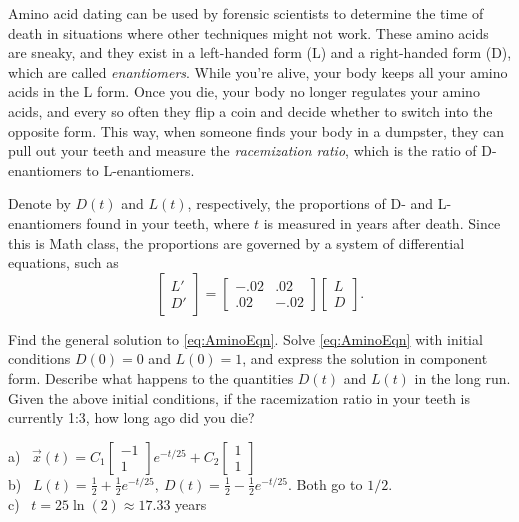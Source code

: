 \begin{exercise}
Amino acid dating can be used by forensic scientists to determine the time of death in situations where other techniques might not work. These amino acids are sneaky, and they exist in a left-handed form (L) and a right-handed form (D), which are called {\it enantiomers}. While you’re alive, your body keeps all your amino acids in the L form. Once you die, your body no longer regulates your amino acids, and every so often they flip a coin and decide whether to switch into the opposite form. This way, when someone finds your body in a dumpster, they can pull out your teeth and measure the {\it racemization ratio}, which is the ratio of D-enantiomers to L-enantiomers. %

Denote by $D(t)$ and $L(t)$, respectively, the proportions of D- and L-enantiomers found in your teeth, where $t$ is measured in years after death. Since this is Math class, the proportions are governed by a system of differential equations, such as
\begin{equation}
\begin{bmatrix} L' \\ D' \end{bmatrix} = \begin{bmatrix} -.02& .02\\ .02 & -.02 \end{bmatrix}\begin{bmatrix} L\\ D \end{bmatrix}.\label{eq:AminoEqn}
\end{equation}
\begin{tasks}
\task Find the general solution to \eqref{eq:AminoEqn}.
\task Solve \eqref{eq:AminoEqn} with initial conditions $D(0) = 0$ and $L(0) = 1$, and express the solution in component form. Describe what happens to the quantities $D(t)$ and $L(t)$ in the long run.
\task Given the above initial conditions, if the racemization ratio in your teeth is currently 1:3, how long ago did you die?
\end{tasks}
\end{exercise}
\comboSol{%
}
{%
a)~ $\vec{x}(t) = C_1 \left[\begin{smallmatrix} -1 \\ 1 \end{smallmatrix}\right]e^{-t/25} + C_2\left[\begin{smallmatrix} 1 \\ 1 \end{smallmatrix}\right]$ \\ b)~ $L(t) = \frac{1}{2} + \frac{1}{2}e^{-t/25},\ D(t) = \frac{1}{2} - \frac{1}{2}e^{-t/25}$. Both go to $1/2$. \\ c)~ $t = 25\ln(2)\approx 17.33$ years
}

